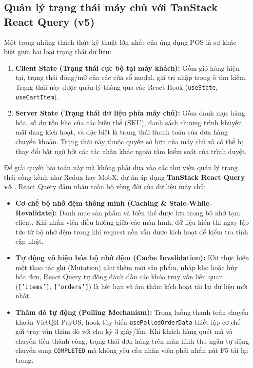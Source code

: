 \subsection{Quản lý trạng thái máy chủ với TanStack React Query (v5)}
Một trong những thách thức kỹ thuật lớn nhất của ứng dụng POS là sự khác biệt giữa hai loại trạng thái dữ liệu:
\begin{enumerate}[label=\alph*., leftmargin=1.5cm]
    \item \textbf{Client State (Trạng thái cục bộ tại máy khách):} Gồm giỏ hàng hiện tại, trạng thái đóng/mở của các cửa sổ modal, giá trị nhập trong ô tìm kiếm. Trạng thái này được quản lý thông qua các React Hook (\texttt{useState}, \texttt{useCartItem}).
    \item \textbf{Server State (Trạng thái dữ liệu phía máy chủ):} Gồm danh mục hàng hóa, số dư tồn kho của các biến thể (SKU), danh sách chương trình khuyến mãi đang kích hoạt, và đặc biệt là trạng thái thanh toán của đơn hàng chuyển khoản. Trạng thái này thuộc quyền sở hữu của máy chủ và có thể bị thay đổi bất ngờ bởi các tác nhân khác ngoài tầm kiểm soát của trình duyệt.
\end{enumerate}

Để giải quyết bài toán này mà không phải dựa vào các thư viện quản lý trạng thái cồng kềnh như Redux hay MobX, dự án áp dụng \textbf{TanStack React Query v5} \cite{tanstackquery2024}. React Query đảm nhận toàn bộ vòng đời của dữ liệu máy chủ:
\begin{itemize}[leftmargin=1.5cm]
    \item \textbf{Cơ chế bộ nhớ đệm thông minh (Caching \& Stale-While-Revalidate):} Danh mục sản phẩm và biến thể được lưu trong bộ nhớ tạm client. Khi nhân viên điều hướng giữa các màn hình, dữ liệu hiển thị ngay lập tức từ bộ nhớ đệm trong khi request nền vẫn được kích hoạt để kiểm tra tính cập nhật.
    \item \textbf{Tự động vô hiệu hóa bộ nhớ đệm (Cache Invalidation):} Khi thực hiện một thao tác ghi (Mutation) như thêm mới sản phẩm, nhập kho hoặc hủy hóa đơn, React Query tự động đánh dấu các khóa truy vấn liên quan (\texttt{['items']}, \texttt{['orders']}) là hết hạn và âm thầm kích hoạt tải lại dữ liệu mới nhất.
    \item \textbf{Thăm dò tự động (Polling Mechanism):} Trong luồng thanh toán chuyển khoản VietQR PayOS, hook tùy biến \texttt{usePolledOrderData} thiết lập cơ chế gửi truy vấn thăm dò với chu kỳ $3$ giây/lần. Khi khách hàng quét mã và chuyển tiền thành công, trạng thái đơn hàng trên màn hình thu ngân tự động chuyển sang \texttt{COMPLETED} mà không yêu cầu nhân viên phải nhấn nút F5 tải lại trang.
\end{itemize}

